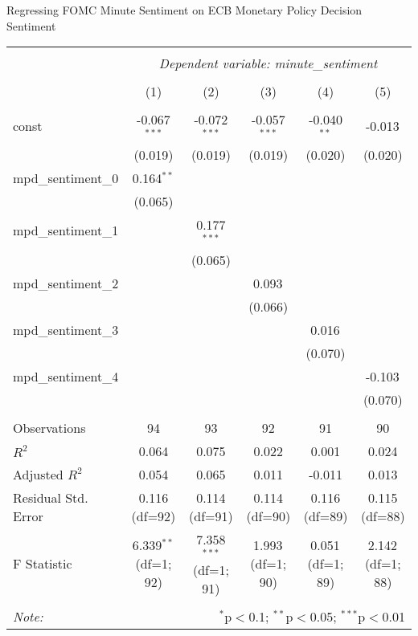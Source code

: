 \documentclass[12pt, letterpaper]{article}
\begin{document}
Regressing FOMC Minute Sentiment on ECB Monetary Policy Decision Sentiment

\begin{table}[H]
\begin{adjustbox}{width=\textwidth}
\centering
\begin{tabular}{@{}lccccc@{}}
\\[-1.8ex]\hline
\hline \\[-1.8ex]
& \multicolumn{5}{c}{\textit{Dependent variable: minute\_sentiment}} \\
\cline{2-6}
\\[-1.8ex] & (1) & (2) & (3) & (4) & (5) \\
\hline \\[-1.8ex]
const & -0.067$^{***}$ & -0.072$^{***}$ & -0.057$^{***}$ & -0.040$^{**}$ & -0.013$^{}$ \\
& (0.019) & (0.019) & (0.019) & (0.020) & (0.020) \\
mpd\_sentiment\_0 & 0.164$^{**}$ & & & & \\
& (0.065) & & & & \\
mpd\_sentiment\_1 & & 0.177$^{***}$ & & & \\
& & (0.065) & & & \\
mpd\_sentiment\_2 & & & 0.093$^{}$ & & \\
& & & (0.066) & & \\
mpd\_sentiment\_3 & & & & 0.016$^{}$ & \\
& & & & (0.070) & \\
mpd\_sentiment\_4 & & & & & -0.103$^{}$ \\
& & & & & (0.070) \\
\hline \\[-1.8ex]
Observations & 94 & 93 & 92 & 91 & 90 \\
$R^2$ & 0.064 & 0.075 & 0.022 & 0.001 & 0.024 \\
Adjusted $R^2$ & 0.054 & 0.065 & 0.011 & -0.011 & 0.013 \\
Residual Std. Error & 0.116 (df=92) & 0.114 (df=91) & 0.114 (df=90) & 0.116 (df=89) & 0.115 (df=88) \\
F Statistic & 6.339$^{**}$ (df=1; 92) & 7.358$^{***}$ (df=1; 91) & 1.993$^{}$ (df=1; 90) & 0.051$^{}$ (df=1; 89) & 2.142$^{}$ (df=1; 88) \\
\hline
\hline \\[-1.8ex]
\textit{Note:} & \multicolumn{5}{r}{$^{*}$p$<$0.1; $^{**}$p$<$0.05; $^{***}$p$<$0.01} \\
\end{tabular}
\end{adjustbox}
\end{table}
\end{document}
